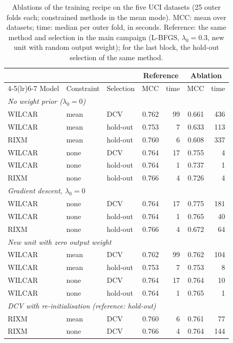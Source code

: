 \begin{table}[H]\centering\small
\caption{Ablations of the training recipe on the five UCI datasets (25 outer folds each; constrained methods in the mean mode). MCC: mean over datasets; time: median per outer fold, in seconds. Reference: the same method and selection in the main campaign (L-BFGS, $\lambda_0=0.3$, new unit with random output weight); for the last block, the hold-out selection of the same method.}
\label{tab:ablation}
\begin{tabular}{lllrrrr}\toprule
 & & & \multicolumn{2}{c}{Reference} & \multicolumn{2}{c}{Ablation} \\\cmidrule(lr){4-5}\cmidrule(lr){6-7}
Model & Constraint & Selection & MCC & time & MCC & time \\\midrule
\multicolumn{7}{l}{\emph{No weight prior ($\lambda_0=0$)}}\\
WILCAR & mean & DCV & 0.762 & 99 & 0.661 & 436 \\
WILCAR & mean & hold-out & 0.753 & 7 & 0.633 & 113 \\
RIXM & mean & hold-out & 0.760 & 6 & 0.608 & 337 \\
WILCAR & none & DCV & 0.764 & 17 & 0.755 & 4 \\
WILCAR & none & hold-out & 0.764 & 1 & 0.737 & 1 \\
RIXM & none & hold-out & 0.766 & 4 & 0.726 & 4 \\
\multicolumn{7}{l}{\emph{Gradient descent, $\lambda_0=0$ \citep{Sa2022}}}\\
WILCAR & none & DCV & 0.764 & 17 & 0.775 & 181 \\
WILCAR & none & hold-out & 0.764 & 1 & 0.765 & 40 \\
RIXM & none & hold-out & 0.766 & 4 & 0.672 & 64 \\
\multicolumn{7}{l}{\emph{New unit with zero output weight}}\\
WILCAR & mean & DCV & 0.762 & 99 & 0.762 & 104 \\
WILCAR & mean & hold-out & 0.753 & 7 & 0.753 & 8 \\
WILCAR & none & DCV & 0.764 & 17 & 0.764 & 10 \\
WILCAR & none & hold-out & 0.764 & 1 & 0.765 & 1 \\
\multicolumn{7}{l}{\emph{DCV with re-initialisation (reference: hold-out)}}\\
RIXM & mean & DCV & 0.760 & 6 & 0.761 & 77 \\
RIXM & none & DCV & 0.766 & 4 & 0.764 & 144 \\
\bottomrule\end{tabular}\end{table}